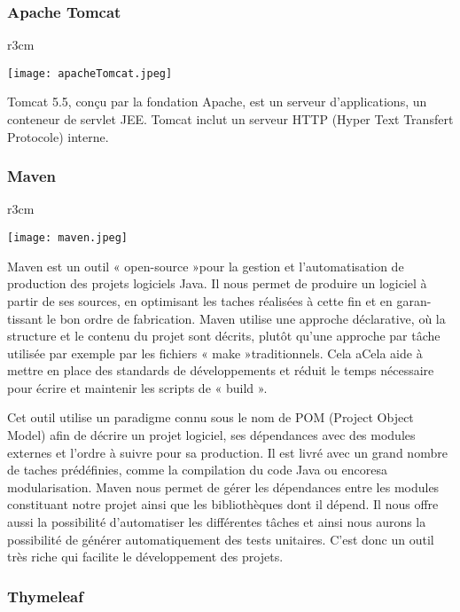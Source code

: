 \documentclass[../rapportdestage.tex]{subfiles}
\begin{document}
		\subsubsection{Apache Tomcat}
			
    \begin{wrapfigure}[4]{r}{3cm}

\texttt{[image: apacheTomcat.jpeg]}
  
 
  
\end{wrapfigure}
	Tomcat 5.5, conçu par la fondation Apache, est un serveur
d'applications, un conteneur de servlet JEE. Tomcat inclut un serveur
HTTP (Hyper Text Transfert Protocole) interne.	
		
		\subsubsection{Maven}
		
    \begin{wrapfigure}[4]{r}{3cm}

\texttt{[image: maven.jpeg]}
 
  
\end{wrapfigure}
	Maven est un outil « open-source »pour la gestion et l’automatisation de
production des projets logiciels Java. Il nous permet de produire un logiciel à
partir de ses sources, en optimisant les taches réalisées à cette fin et en garan-
tissant le bon ordre de fabrication. Maven utilise une approche déclarative, où la
structure et le contenu du projet sont décrits, plutôt qu’une approche par tâche
utilisée par exemple par les fichiers « make »traditionnels. Cela aCela aide à mettre
en place des standards de développements et réduit le temps nécessaire pour
écrire et maintenir les scripts de « build ».

Cet outil utilise un paradigme connu sous le nom de POM (Project Object
Model) afin de décrire un projet logiciel, ses dépendances avec des modules
externes et l’ordre à suivre pour sa production. Il est livré avec un grand
nombre de taches prédéfinies, comme la compilation du code Java ou encoresa modularisation.
Maven nous permet de gérer les dépendances entre les modules constituant
notre projet ainsi que les bibliothèques dont il dépend.
 Il nous offre aussi la possibilité d’automatiser les différentes tâches et ainsi nous aurons la possibilité de générer automatiquement des tests unitaires. C’est donc un outil très riche
qui facilite le développement des projets.
	\subsubsection{Thymeleaf}
	
\end{document}
